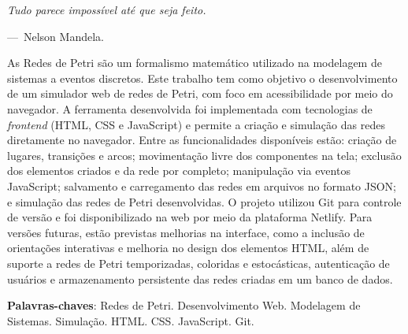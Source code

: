 \documentclass[
	12pt,				%
	openright,			%
	oneside,			%
	a4paper,			%
	english,			%
	brazil				%
	]{abntex2}
\theoremstyle{doispontos}
\begin{document}
\begin{epigrafe}
    \vspace*{\fill}
\epigraph{\textsl{Tudo parece impossível até que seja feito.}}{---~Nelson Mandela.}
\end{epigrafe}


\setlength{\absparsep}{18pt} %
\begin{resumo}
 \noindent
 
 As Redes de Petri são um formalismo matemático utilizado na modelagem de sistemas a eventos discretos. Este trabalho tem como objetivo o desenvolvimento de um simulador web de redes de Petri, com foco em acessibilidade por meio do navegador. A ferramenta desenvolvida foi implementada com tecnologias de \textit{frontend} (HTML, CSS e JavaScript) e permite a criação e simulação das redes diretamente no navegador. Entre as funcionalidades disponíveis estão: criação de lugares, transições e arcos; movimentação livre dos componentes na tela; exclusão dos elementos criados e da rede por completo; manipulação via eventos JavaScript; salvamento e carregamento das redes em arquivos no formato JSON; e simulação das redes de Petri desenvolvidas. O projeto utilizou Git para controle de versão e foi disponibilizado na web por meio da plataforma Netlify. Para versões futuras, estão previstas melhorias na interface, como a inclusão de orientações interativas e melhoria no design dos elementos HTML, além de suporte a redes de Petri temporizadas, coloridas e estocásticas, autenticação de usuários e armazenamento persistente das redes criadas em um banco de dados.

\vspace{\onelineskip}

 \textbf{Palavras-chaves}: Redes de Petri. Desenvolvimento Web. Modelagem de Sistemas. Simulação. HTML. CSS. JavaScript. Git.  
\end{resumo}
\end{document}
